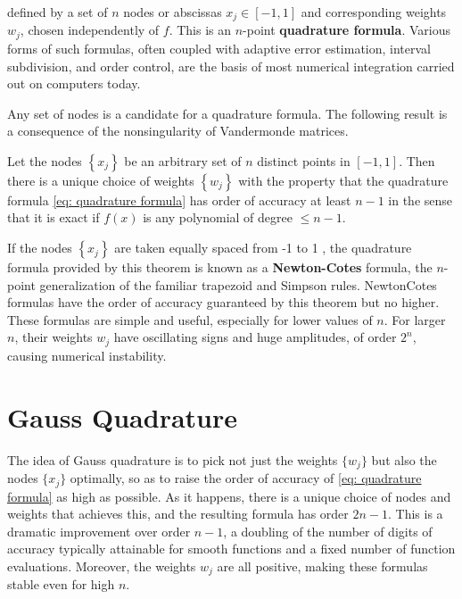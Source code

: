 defined by a set of $ n $ nodes or abscissas $ x_j \in [-1,1] $ and corresponding weights $ w_j $, chosen independently of $ f $. This is an $ n $-point \textbf{quadrature formula}. Various forms of such formulas, often coupled with adaptive error estimation, interval subdivision, and order control, are the basis of most numerical integration carried out on computers today.

Any set of nodes is a candidate for a quadrature formula. The following result is a consequence of the nonsingularity of Vandermonde matrices.  


\begin{theorem}
\label{thm: quadrature formula}
Let the nodes $\left\{x_j\right\}$ be an arbitrary set of $n$ distinct points in $[-1,1]$. Then there is a unique choice of weights $\left\{w_j\right\}$ with the property that the quadrature formula \eqref{eq: quadrature formula} has order of accuracy at least $n-1$ in the sense that it is exact if $f(x)$ is any polynomial of degree $\leq n-1$.
\end{theorem}


If the nodes $\left\{x_j\right\}$ are taken equally spaced from -1 to 1 , the quadrature formula provided by this theorem is known as a \textbf{Newton-Cotes} formula, the $n$-point generalization of the familiar trapezoid and Simpson rules. NewtonCotes formulas have the order of accuracy guaranteed by this theorem but no higher. These formulas are simple and useful, especially for lower values of $n$. For larger $n$, their weights $w_j$ have oscillating signs and huge amplitudes, of order $2^n$, causing numerical instability.

\section{Gauss Quadrature} 
 The idea of Gauss quadrature is to pick not just the weights $ \{w_j\}  $ but also the nodes $ \{x_j\}  $ optimally, so as to raise the order of accuracy of \eqref{eq: quadrature formula} as high as possible. As it happens, there is a unique choice of nodes and weights that achieves this, and the resulting formula has order $ 2n-1 $.  This is a dramatic improvement over order $ n-1 $, a doubling of the number of digits of accuracy typically attainable for smooth functions and a fixed number of function evaluations.  Moreover, the weights $ w_j $ are all positive, making these formulas stable even for high $ n $. 

